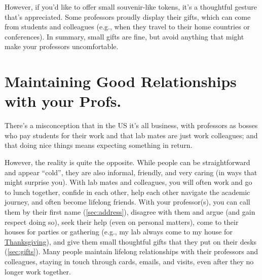 \documentclass[oneside,11pt,dvipsnames]{book}
\begin{document}
However, if you'd like to offer small souvenir-like tokens, it's a thoughtful gesture that's appreciated. Some professors proudly display their gifts, which can come from students and colleagues (e.g., when they travel to their home countries or conferences). In summary, small gifts are fine, but avoid anything that might make your professors uncomfortable.


\section{Maintaining Good Relationships with your Profs.}
There's a misconception that in the US it's all business, with professors as bosses who pay students for their work and that lab mates are just work colleagues; and that doing nice things means expecting something in return.

However, the reality is quite the opposite. While people can be straightforward and appear ``cold'', they are also informal, friendly, and very caring (in ways that might surprise you).
With lab mates and colleagues, you will often work and go to lunch together, confide in each other, help each other navigate the academic journey, and often become lifelong friends.
With your professor(s), you can call them by their first name (\autoref{sec:address}), disagree with them and argue (and gain respect doing so), seek their help (even on personal matters), come to their houses for parties or gathering (e.g., my lab always come to my house for \href{https://photos.app.goo.gl/LFtbqQUuznq9eiL7A}{Thanksgiving}), and give them small thoughtful gifts that they put on their desks (\autoref{sec:gifts}).  
Many people maintain lifelong relationships with their professors and colleagues, staying in touch through cards, emails, and visits, even after they no longer work together.
\end{document}
